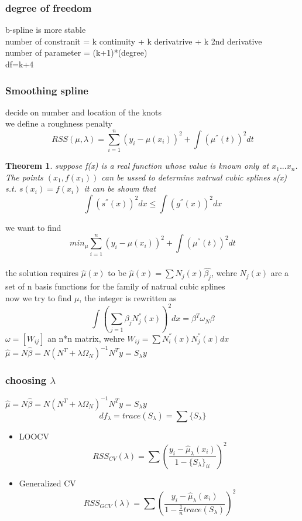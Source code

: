 \documentclass[10pt]{article}
\theoremstyle{break}
\newtheorem{thm}{Theorem}[subsection]
\begin{document}
        \subsubsection{degree of freedom}
            b-spline is more stable\\
            number of constranit = k continuity + k derivatrive + k 2nd derivative\\
            number of parameter = (k+1)*(degree)\\
            df=k+4
        \subsubsection{Smoothing spline}
            decide on number and location of the knots\\
            we define a roughness penalty
            $$RSS(\mu, \lambda)=\sum^n_{i=1}(y_i-\mu(x_i))^2+\int(\mu^{''}(t))^2dt$$
            \begin{thm}
                suppose f(x) is a real function whose value is known only at $x_1 ... x_n$. The points 
                $(x_1, f(x_1))$ can be ussed to determine natrual cubic splines s(x) s.t. 
                $s(x_i)=f(x_i)$ it can be shown that 
                $$\int(s^{''}(x))^2dx\leq \int(g^{''}(x))^2dx$$ 
            \end{thm}
            we want to find $$min_\mu\sum^n_{i=1}(y_i-\mu(x_i))^2+\int(\mu^{''}(t))^2dt$$
            \\the solution requires $\hat{\mu}(x)$ to be $\hat{\mu}(x)=\sum N_j(x)\hat{\beta_j}$, wehre $N_j(x)$ are a set of n basis functions for the family of natrual cubic splines
            \\now we try to find $\mu$, the integer is rewritten as  
            $$\int (\sum_{j=1}\beta_jN_j^{''}(x))^2dx=\beta^T\omega_N\beta $$
            $\omega=[W_{ij}]$ an n*n matrix, wehre $W_{ij}=\sum N^{''}_i(x)N^{''}_j(x)dx$
            \\$\hat{\mu} = N \hat{\beta} = N(N^T+\lambda\Omega_N)^{-1}N^Ty = S_\lambda y$
        \subsubsection{choosing $\lambda$}
            $\hat{\mu} = N \hat{\beta} = N(N^T+\lambda\Omega_N)^{-1}N^Ty = S_\lambda y$
            $$df_\lambda = trace(S_\lambda)=\sum \{S_\lambda\}$$
            \begin{itemize}
                \item LOOCV 
                $$RSS_{CV}(\lambda)=\sum\left(\frac{y_i-\hat{\mu}_\lambda (x_i)}{1-\{S_\lambda\}_{ii}}\right)^2$$
                \item Generalized CV 
                $$RSS_{GCV}(\lambda)=\sum\left(\frac{y_i-\hat{\mu}_\lambda (x_i)}{1-\frac{1}{n}trace(S_\lambda)}\right)^2$$
            \end{itemize}
\end{document}
